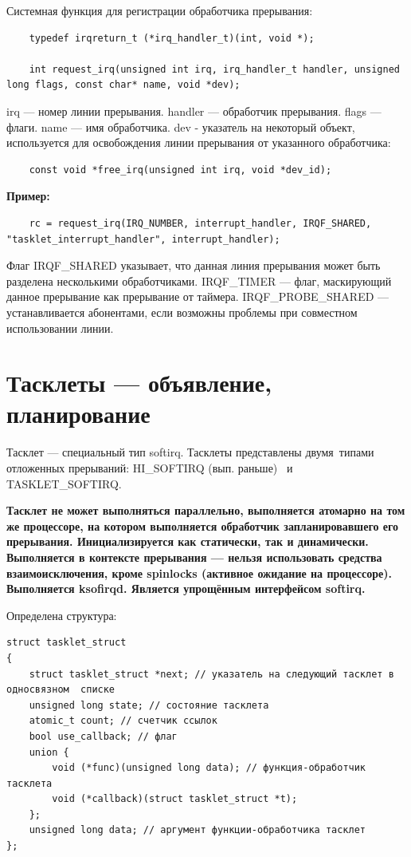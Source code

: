 Системная функция для регистрации обработчика прерывания:

\begin{lstlisting}
	typedef irqreturn_t (*irq_handler_t)(int, void *); 
	
	int request_irq(unsigned int irq, irq_handler_t handler, unsigned long flags, const char* name, void *dev);
\end{lstlisting}

irq --- номер линии прерывания. handler --- обработчик прерывания. flags --- флаги. name --- имя обработчика. dev - указатель на некоторый объект, используется для освобождения линии прерывания от указанного обработчика:

\begin{lstlisting}
	const void *free_irq(unsigned int irq, void *dev_id);
\end{lstlisting}

\textbf{Пример:}
\begin{lstlisting}
	rc = request_irq(IRQ_NUMBER, interrupt_handler, IRQF_SHARED, "tasklet_interrupt_handler", interrupt_handler);
\end{lstlisting}

Флаг IRQF\_SHARED указывает, что данная линия прерывания может быть разделена несколькими обработчиками. IRQF\_TIMER --- флаг, маскирующий данное прерывание как прерывание от таймера. IRQF\_PROBE\_SHARED --- устанавливается абонентами, если возможны проблемы при совместном использовании линии.

\section{Тасклеты --- объявление, планирование}

Тасклет --- специальный тип softirq. Тасклеты представлены двумя типами отложенных прерываний: HI\_SOFTIRQ (вып. раньше)  и TASKLET\_SOFTIRQ.

\textbf{Тасклет не может выполняться параллельно, выполняется атомарно на том же процессоре, на котором выполняется обработчик запланировавшего его прерывания. Инициализируется как статически, так и динамически. Выполняется в контексте прерывания --- нельзя использовать средства взаимоисключения, кроме spinlocks (активное ожидание на процессоре). Выполняется ksofirqd. Является упрощённым интерфейсом softirq.}

Определена структура:

\begin{lstlisting}
struct tasklet_struct
{
	struct tasklet_struct *next; // указатель на следующий тасклет в односвязном  списке
	unsigned long state; // состояние тасклета
	atomic_t count; // счетчик ссылок 
	bool use_callback; // флаг
	union {
		void (*func)(unsigned long data); // функция-обработчик тасклета
		void (*callback)(struct tasklet_struct *t);
	};
	unsigned long data; // аргумент функции-обработчика тасклет
};
\end{lstlisting}

